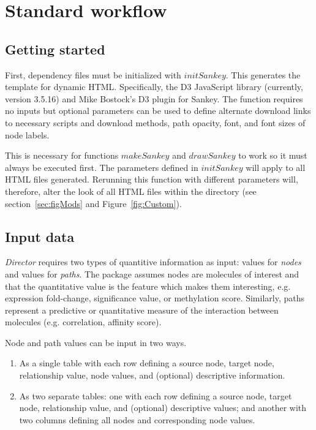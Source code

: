 \documentclass[a4paper]{article}
\begin{document}
\section{Standard workflow}
    \subsection{Getting started}
First, dependency files must be initialized with $initSankey$. This generates the template for dynamic HTML. Specifically, the D3 JavaScript library (currently, version 3.5.16) and Mike Bostock's D3 plugin for Sankey. The function requires no inputs but optional parameters can be used to define alternate download links to necessary scripts and download methods, path opacity, font, and font sizes of node labels.

This is necessary for functions $makeSankey$ and $drawSankey$ to work so it must always be executed first. The parameters defined in $initSankey$ will apply to all HTML files generated. Rerunning this function with different parameters will, therefore, alter the look of all HTML files within the directory (see section~\ref{sec:figMods} and Figure~\ref{fig:Custom}).

    \subsection{Input data}
\textit{Director} requires two types of quantitive information as input: values for \textit{nodes} and values for \textit{paths}. The package assumes nodes are molecules of interest and that the quantitative value is the feature which makes them interesting, e.g. expression fold-change, significance value, or methylation score. Similarly, paths represent a predictive or quantitative measure of the interaction between molecules (e.g. correlation, affinity score).

Node and path values can be input in two ways.
    \begin{enumerate}
        \item As a single table with each row defining a source node, target node, relationship value, node values, and (optional) descriptive information.
        \item As two separate tables: one with each row defining a source node, target node, relationship value, and (optional) descriptive values; and another with two columns defining all nodes and corresponding node values.
    \end{enumerate}
\end{document}
